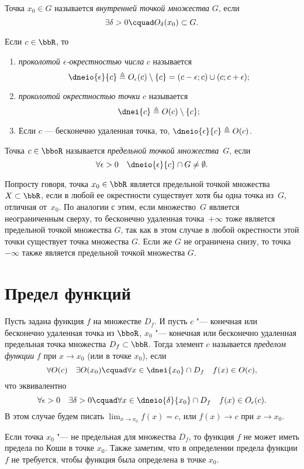 \begin{defn}
Точка $x_0 \in G$ называется \textit{внутренней точкой множества} $G$, если 
$$
\exists \delta >0\cquad O_\delta(x_0) \subset G.
$$
\end{defn}

\begin{defn}
Если $c \in \bbR$, то 
\begin{enumerate}[wide, labelwidth=!, labelindent=0pt, nolistsep]
\item
\textit{проколотой $\epsilon$-окрестностью числа} $c$ называется 
$$
\dneio{\epsilon}{c} \triangleq O_\epsilon(c)\setminus\{c\}=(c-\epsilon;c)\cup(c;c+\epsilon);
$$
\item
\textit{проколотой окрестностью точки} $c$ называется $$\dnei{c} \triangleq O(c)\setminus \{c\};$$
\item[\textbullet]
Если $c$ --- бесконечно удаленная точка, то, $\dneio{\epsilon}{c}\triangleq O (c) $.
\end{enumerate}
\end{defn}

\begin{defn}
Точка $c \in \bboR$ называется \textit{предельной точкой множества}~$G$, если $$\forall \epsilon >0 \quad \dneio{\epsilon}{c} \cap G \ne \emptyset.$$
\end{defn}
Попросту говоря, точка $x_0 \in \bbR$ является предельной точкой множества~$X \subset \bbR$, если в любой ее окрестности существует хотя бы одна точка из~$G$, отличная от~$x_0$. По аналогии с этим, если множество~$G$ является неограниченным сверху, то бесконечно удаленная точка~$+\infty$ тоже является предельной точкой множества $G$, так как в этом случае в любой окрестности этой точки существует точка множества $G$. Если же $G$ не ограничена снизу, то точка $-\infty$ также является предельной точкой множества $G$.

\section{Предел функций}
\begin{defn}\label{df:ch2:predelCaushi}
Пусть задана функция $f$ на множестве $D_f$. И пусть $c$ "--- конечная или бесконечно удаленная точка из $\bboR$, $x_0$ "--- конечная или бесконечно удаленная предельная точка  множества $D_f \subset \bbR$. Тогда элемент $c$ называется \textit{пределом функции} $f$ при $x \to x_0$ (или в точке $x_0$), если
$$
\forall O(c)\quad \exists O(x_0)\cquad \forall x \in \dnei{x_0}\cap D_f\quad f(x) \in O(c),
$$  
что эквивалентно
$$
\forall \epsilon > 0\quad \exists \delta >0\cquad \forall x \in \dneio{\delta}{x_0} \cap D_f\quad f(x) \in O_\epsilon (c). 
$$
В этом случае будем писать $\lim_{x \to x_0}\limits f(x) = c$, или $f(x)\to c$ при $x \to x_0$.
\end{defn}
Если точка $x_0$ "--- не предельная для множества $D_f$, то функция $f$ не может иметь предела по Коши в точке $x_0$. Также заметим, что в определении предела функции $f$ не требуется, чтобы функция была определена в точке $x_0$.

